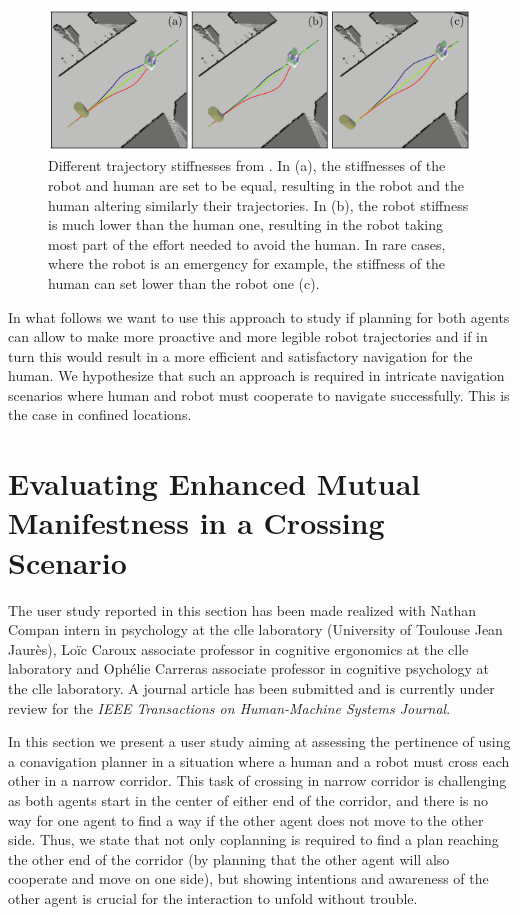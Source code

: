 \documentclass[a4paper,11pt,twoside]{StyleThese}
\begin{document}
\begin{figure}[hbtp]
\centering
\includegraphics[width=\textwidth]{figures/chapter2/hateb_effort.png}
\caption{Different trajectory stiffnesses from \cite{khambhaita_viewing_2017}. In (a), the stiffnesses of the robot and human are set to be equal, resulting in the robot and the human altering similarly their trajectories. In (b), the robot stiffness is much lower than the human one, resulting in the robot taking most part of the effort needed to avoid the human. In rare cases, where the robot is an emergency for example, the stiffness of the human can set lower than the robot one (c).}
\label{fig:hateb_effort}
\end{figure}

In what follows we want to use this approach to study if planning for both agents can allow to make more proactive and more legible robot trajectories and if in turn this would result in a more efficient and satisfactory navigation for the human. We hypothesize that such an approach is required in intricate navigation scenarios where human and robot must cooperate to navigate successfully. This is the case in confined locations.

\section[Evaluation Through a User Study]{Evaluating Enhanced Mutual Manifestness in a Crossing Scenario}

The user study reported in this section has been made realized with Nathan Compan intern in psychology at the \acrfull{clle} laboratory (University of Toulouse Jean Jaurès), Lo\"ic Caroux associate professor in cognitive ergonomics at the \acrshort{clle} laboratory and Ophélie Carreras associate professor in cognitive psychology at the \acrshort{clle} laboratory. A journal article has been submitted and is currently under review for the \textit{IEEE Transactions on Human-Machine Systems Journal}.

In this section we present a user study aiming at assessing the pertinence of using a conavigation planner in a situation where a human and a robot must cross each other in a narrow corridor. This task of crossing in narrow corridor is challenging as both agents start in the center of either end of the corridor, and there is no way for one agent to find a way if the other agent does not move to the other side. Thus, we state that not only coplanning is required to find a plan reaching the other end of the corridor (by planning that the other agent will also cooperate and move on one side), but showing intentions and awareness of the other agent is crucial for the interaction to unfold without trouble.
\end{document}
